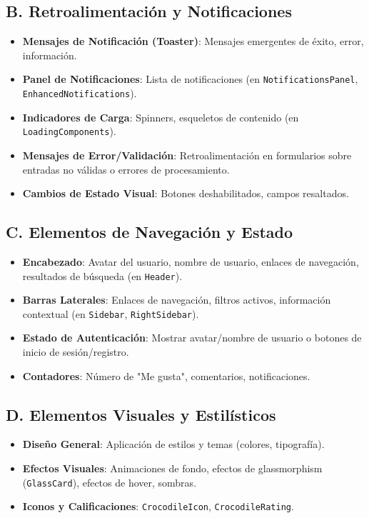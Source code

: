 \documentclass{article}
\begin{document}
	\subsection*{B. Retroalimentación y Notificaciones}
	\begin{itemize}
		\item \textbf{Mensajes de Notificación (Toaster)}: Mensajes emergentes de éxito,
			error, información.

		\item \textbf{Panel de Notificaciones}: Lista de notificaciones (en \texttt{NotificationsPanel},
			\texttt{EnhancedNotifications}).

		\item \textbf{Indicadores de Carga}: Spinners, esqueletos de contenido (en \texttt{LoadingComponents}).

		\item \textbf{Mensajes de Error/Validación}: Retroalimentación en formularios
			sobre entradas no válidas o errores de procesamiento.

		\item \textbf{Cambios de Estado Visual}: Botones deshabilitados, campos
			resaltados.
	\end{itemize}

	\subsection*{C. Elementos de Navegación y Estado}
	\begin{itemize}
		\item \textbf{Encabezado}: Avatar del usuario, nombre de usuario, enlaces de
			navegación, resultados de búsqueda (en \texttt{Header}).

		\item \textbf{Barras Laterales}: Enlaces de navegación, filtros activos, información
			contextual (en \texttt{Sidebar}, \texttt{RightSidebar}).

		\item \textbf{Estado de Autenticación}: Mostrar avatar/nombre de usuario o botones
			de inicio de sesión/registro.

		\item \textbf{Contadores}: Número de "Me gusta", comentarios, notificaciones.
	\end{itemize}

	\subsection*{D. Elementos Visuales y Estilísticos}
	\begin{itemize}
		\item \textbf{Diseño General}: Aplicación de estilos y temas (colores, tipografía).

		\item \textbf{Efectos Visuales}: Animaciones de fondo, efectos de
			glassmorphism (\texttt{GlassCard}), efectos de hover, sombras.

		\item \textbf{Iconos y Calificaciones}: \texttt{CrocodileIcon}, \texttt{CrocodileRating}.
	\end{itemize}
\end{document}
